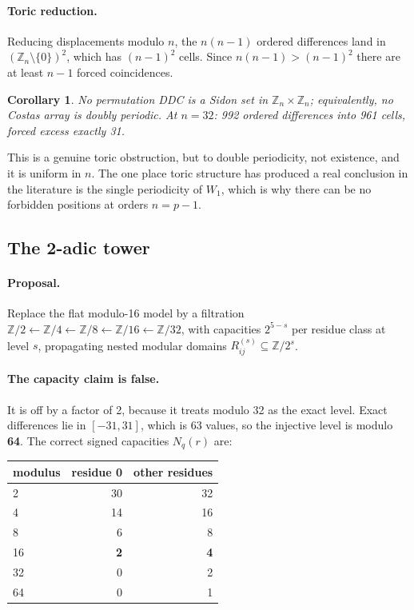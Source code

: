 \documentclass[11pt,a4paper]{article}
\newtheorem{corollary}[theorem]{Corollary}
\theoremstyle{definition}
\newcommand{\Z}{\mathbb{Z}}
\begin{document}
\paragraph{Toric reduction.} Reducing displacements modulo $n$, the $n(n-1)$
ordered differences land in $(\Z_n\setminus\{0\})^2$, which has $(n-1)^2$ cells.
Since $n(n-1)>(n-1)^2$ there are at least $n-1$ forced coincidences.

\begin{corollary}
No permutation DDC is a Sidon set in $\Z_n\times\Z_n$; equivalently, no Costas
array is doubly periodic. At $n=32$: 992 ordered differences into 961 cells,
forced excess exactly 31.
\end{corollary}

This is a genuine toric obstruction, but to double periodicity, not existence,
and it is uniform in $n$. The one place toric structure has produced a real
conclusion in the literature is the single periodicity of $W_1$, which is why
there can be no forbidden positions at orders $n=p-1$.

\subsection{The 2-adic tower}
\label{sec:2adic}

\paragraph{Proposal.} Replace the flat modulo-16 model by a filtration
$\Z/2\leftarrow\Z/4\leftarrow\Z/8\leftarrow\Z/16\leftarrow\Z/32$, with
capacities $2^{5-s}$ per residue class at level $s$, propagating nested modular
domains $R^{(s)}_{ij}\subseteq \Z/2^s$.

\paragraph{The capacity claim is false.} It is off by a factor of 2, because it
treats modulo 32 as the exact level. Exact differences lie in $[-31,31]$, which
is 63 values, so the injective level is modulo \textbf{64}. The correct signed
capacities $N_q(r)$ are:

\begin{center}
\begin{tabular}{@{}lrr@{}}
\toprule
modulus & residue 0 & other residues \\
\midrule
2 & 30 & 32 \\
4 & 14 & 16 \\
8 & 6 & 8 \\
16 & \textbf{2} & \textbf{4} \\
32 & 0 & 2 \\
64 & 0 & 1 \\
\bottomrule
\end{tabular}
\end{center}
\end{document}
